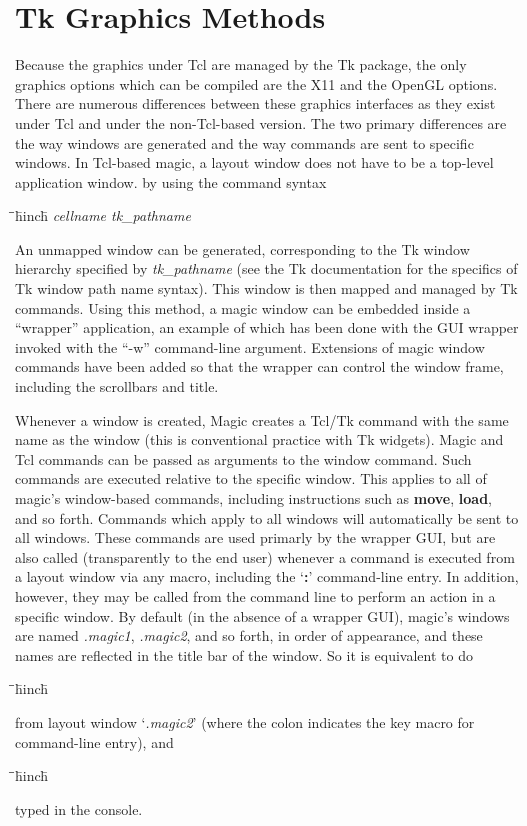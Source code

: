 \documentclass[letterpaper,twoside,12pt]{article}
\def\hinch{\hspace*{0.5in}}
\def\starti{\begin{center}\begin{tabbing}\hinch\=\hinch\=\hinch\=hinch\hinch\=\kill}
\def\endi{\end{tabbing}\end{center}}
\def\ii{\>\>\>}
\begin{document}
\section{Tk Graphics Methods}

Because the graphics under Tcl are managed by the Tk package, the only
graphics options which can be compiled are the X11 and the OpenGL
options.  There are numerous differences between these graphics
interfaces as they exist under Tcl and under the non-Tcl-based version.
The two primary differences are the way windows are generated and the
way commands are sent to specific windows.  In Tcl-based magic, a
layout window does not have to be a top-level application window.
by using the command syntax
\starti
   \ii {\bfseries openwindow} {\itshape cellname tk\_pathname}
\endi

An unmapped window can be generated, corresponding to the Tk window
hierarchy specified by {\itshape tk\_pathname} (see the Tk documentation
for the specifics of Tk window path name syntax).  This window is then
mapped and managed by Tk commands.  Using this method, a magic window
can be embedded inside a ``wrapper'' application, an example of which
has been done with the GUI wrapper invoked with the ``{\ttfamily -w}''
command-line argument.  Extensions of magic window commands have been
added so that the wrapper can control the window frame, including the
scrollbars and title.

Whenever a window is created, Magic creates a Tcl/Tk command with the
same name as the window (this is conventional practice with Tk widgets).
Magic and Tcl commands can be passed as arguments to the window
command.  Such commands are executed relative to the specific window.
This applies to all of magic's window-based commands, including
instructions such as {\bfseries move}, {\bfseries load}, and so forth.
Commands which apply to all windows will automatically be sent to all
windows.  These commands are used primarly by the wrapper GUI, but are
also called (transparently to the end user) whenever a command is
executed from a layout window via any macro, including the
`{\bfseries :}' command-line entry.  In addition, however,
they may be called from the command line to perform an action
in a specific window.  By default (in the absence of a wrapper GUI),
magic's windows are named {\itshape .magic1}, {\itshape .magic2}, and
so forth, in order of appearance, and these names are reflected in the
title bar of the window.  So it is equivalent to do
\starti
   \ii {\bfseries :move s 10}
\endi
from layout window `{\itshape .magic2}' (where the colon indicates the
key macro for command-line entry), and 
\starti
   \ii {\bfseries .magic2 move s 10}
\endi
typed in the console.
\end{document}
